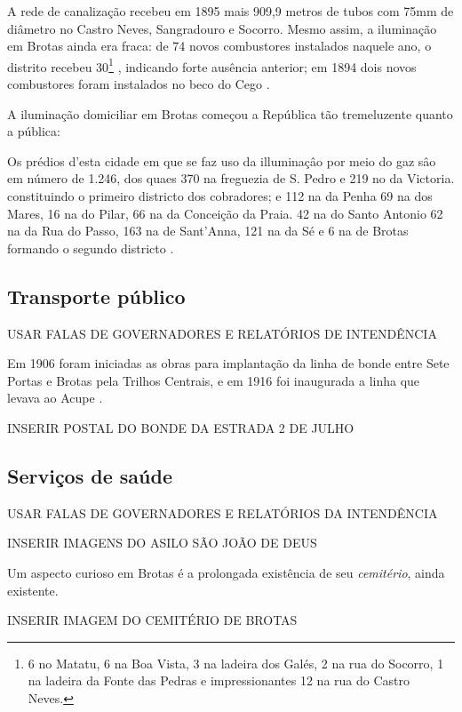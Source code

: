 A rede de canalização recebeu em 1895 mais 909,9 metros de tubos com 75mm de diâmetro no Castro Neves, Sangradouro e Socorro. Mesmo assim, a iluminação em Brotas ainda era fraca: de 74 novos combustores instalados naquele ano, o distrito recebeu 30\footnote{6 no Matatu, 6 na Boa Vista, 3 na ladeira dos Galés, 2 na rua do Socorro, 1 na ladeira da Fonte das Pedras e impressionantes 12 na rua do Castro Neves.} \cite[pp.~149-150]{salvador_relatorio_1896}, indicando forte ausência anterior; em 1894 dois novos combustores foram instalados no beco do Cego \cite[p.~179]{salvador_relatorio_1894}.

A iluminação domiciliar em Brotas começou a República tão tremeluzente quanto a pública:

\begin{citacao}
Os prédios d'esta cidade em que se faz uso da illuminaçâo por meio do gaz sâo em número de 1.246, dos quaes 370 na freguezia de S. Pedro e 219 no da Victoria. constituindo o primeiro districto dos cobradores; e 112 na da Penha 69 na dos Mares, 16 na do Pilar, 66 na da Conceição da Praia. 42 na do Santo Antonio 62 na da Rua do Passo, 163 na de Sant'Anna, 121 na da Sé e 6 na de Brotas formando o segundo districto \cite[p.~151]{salvador_relatorio_1896}. 
\end{citacao}

\subsection{Transporte público}

USAR FALAS DE GOVERNADORES E RELATÓRIOS DE INTENDÊNCIA


Em 1906 foram iniciadas as obras para implantação da linha de bonde entre Sete Portas e Brotas pela Trilhos Centrais, e em 1916 foi inaugurada a linha que levava ao Acupe \cite[p.~299]{VASCONCELOS2002}.

INSERIR POSTAL DO BONDE DA ESTRADA 2 DE JULHO


\subsection{Serviços de saúde}

USAR FALAS DE GOVERNADORES E RELATÓRIOS DA INTENDÊNCIA

INSERIR IMAGENS DO ASILO SÃO JOÃO DE DEUS

Um aspecto curioso em Brotas é a prolongada existência de seu \textit{cemitério}, ainda existente.

INSERIR IMAGEM DO CEMITÉRIO DE BROTAS


